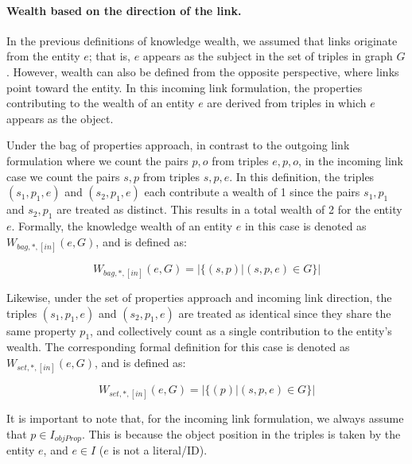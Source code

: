 \paragraph{Wealth based on the direction of the link.}
In the previous definitions of knowledge wealth, we assumed that links originate from the entity \(e\); that is, \(e\) appears as the subject in the set of triples in graph \(G\). However, wealth can also be defined from the opposite perspective, where links point toward the entity. In this incoming link formulation, the properties contributing to the wealth of an entity \(e\) are derived from triples in which \(e\) appears as the object.

Under the bag of properties approach, in contrast to the outgoing link formulation where we count the pairs \(p, o\) from triples \(e, p, o\), in the incoming link case we count the pairs \(s, p\) from triples \(s, p, e\). In this definition, the triples \((s_1, p_1, e)\) and \((s_2, p_1, e)\) each contribute a wealth of 1 since the pairs \(s_1, p_1\) and \(s_2, p_1\) are treated as distinct. This results in a total wealth of 2 for the entity \(e\). Formally, the knowledge wealth of an entity \(e\) in this case is denoted as \(W_{bag, *, [in]}(e,G)\), and is defined as:

\[
    W_{bag, *, [in]}(e,G) = |\{(s, p) | (s, p, e) \in G\}|
\]

Likewise, under the set of properties approach and incoming link direction, the triples \((s_1, p_1, e)\) and \((s_2, p_1, e)\) are treated as identical since they share the same property \(p_1\), and collectively count as a single contribution to the entity's wealth. The corresponding formal definition for this case is denoted as \(W_{set, *, [in]}(e,G)\), and is defined as:

\[
    W_{set, *, [in]}(e,G) = |\{(p) | (s, p, e) \in G\}|
\]

It is important to note that, for the incoming link formulation, we always assume that \(p \in I_{objProp}\). This is because the object position in the triples is taken by the entity \(e\), and \(e \in I\) (\(e\) is not a literal/ID).


